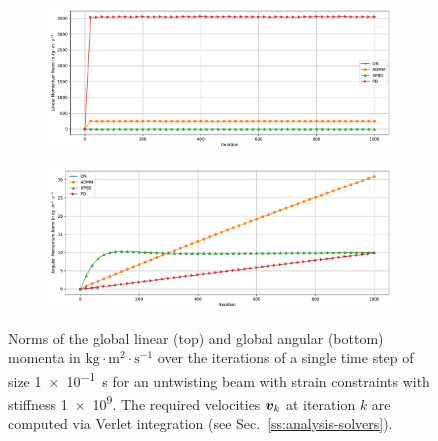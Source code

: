 \begin{figure}[h]
    \centering
    \begin{subfigure}{\textwidth}
        \includegraphics[width=\linewidth]{figures/strain_beam_untwist_momenta_large_ts.pdf}
    \end{subfigure}
    \begin{subfigure}{\textwidth}
        \includegraphics[width=\linewidth]{figures/strain_beam_untwist_angular_momenta_large_ts.pdf}
    \end{subfigure}
    \caption{Norms of the global linear (top) and global angular (bottom) momenta in $\text{kg}\cdot\text{m}^2\cdot\text{s}^{-1}$ over the iterations 
    of a single time step of size \SI{1e-1}{\second} for an untwisting beam with strain constraints with stiffness \num{1e9}. The required velocities 
    $\bm{v}_k$ at iteration $k$ are computed via Verlet integration (see Sec.\ \ref{ss:analysis-solvers}).
}
    \label{fig:strain-beam-untwist-momenta-large-ts}
\end{figure}

